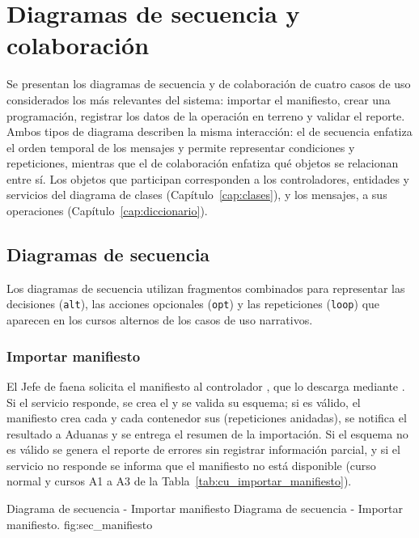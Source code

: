 \chapter{Diagramas de secuencia y colaboración}
\label{cap:interaccion}

\sloppy

Se presentan los diagramas de secuencia y de colaboración de cuatro casos de uso considerados los
más relevantes del sistema: importar el manifiesto, crear una programación, registrar los datos de
la operación en terreno y validar el reporte. Ambos tipos de diagrama describen la misma
interacción: el de secuencia enfatiza el orden temporal de los mensajes y permite representar
condiciones y repeticiones, mientras que el de colaboración enfatiza qué objetos se relacionan
entre sí. Los objetos que participan corresponden a los controladores, entidades y servicios del
diagrama de clases (Capítulo~\ref{cap:clases}), y los mensajes, a sus operaciones
(Capítulo~\ref{cap:diccionario}).

\section{Diagramas de secuencia}
\label{sec:secuencia}

Los diagramas de secuencia utilizan fragmentos combinados para representar las decisiones
(\texttt{alt}), las acciones opcionales (\texttt{opt}) y las repeticiones (\texttt{loop}) que
aparecen en los cursos alternos de los casos de uso narrativos.

\subsection{Importar manifiesto}
\label{subsec:sec_manifiesto}

El Jefe de faena solicita el manifiesto al controlador , que lo descarga
mediante . Si el servicio responde, se crea el  y se
valida su esquema; si es válido, el manifiesto crea cada  y cada contenedor sus
 (repeticiones anidadas), se notifica el resultado a Aduanas y se entrega el
resumen de la importación. Si el esquema no es válido se genera el reporte de errores sin registrar
información parcial, y si el servicio no responde se informa que el manifiesto no está disponible
(curso normal y cursos A1 a A3 de la Tabla~\ref{tab:cu_importar_manifiesto}).

{Diagrama de secuencia - Importar manifiesto}
{Diagrama de secuencia - Importar manifiesto.}
{fig:sec_manifiesto}

